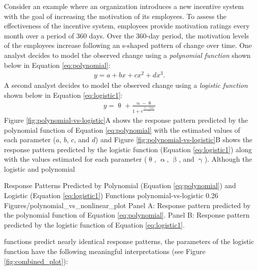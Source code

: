 \documentclass[
12pt, %
twoside,
english]{guelphthesis}
\begin{document}
Consider an example where an organization introduces a new incentive system with the goal of increasing the motivation of its employees. To assess the effectiveness of the incentive system, employees provide motivation ratings every month over a period of 360 days. Over the 360-day period, the motivation levels of the employees increase following an s-shaped pattern of change over time. One analyst decides to model the observed change using a \emph{polynomial function} shown below in Equation \ref{eq:polynomial}:
\begin{align}
  y = \mathit{a} + \mathit{b}x + \mathit{c}x^2 + \mathit{d}x^3.
  \label{eq:polynomial}
\end{align}
\noindent A second analyst decides to model the observed change using a \emph{logistic function} shown below in Equation \ref{eq:logistic1}:
\begin{align}
  y = \uptheta + \frac{\upalpha - \uptheta}{1 + e^{\frac{\upbeta -time}{\upgamma}}}
  \label{eq:logistic1}
\end{align}
\noindent  Figure \ref{fig:polynomial-vs-logistic}A shows the response pattern predicted by the polynomial function of Equation \ref{eq:polynomial} with the estimated values of each parameter (\(a\), \(b\), \(c\), and \(d\)) and Figure \ref{fig:polynomial-vs-logistic}B shows the response pattern predicted by the logistic function (Equation \ref{eq:logistic1}) along with the values estimated for each parameter (\(\uptheta\), \(\upalpha\), \(\upbeta\), and \(\upgamma\)). Although the logistic and polynomial
\begin{apaFigure}
[portrait]
[samepage]
[0cm]
{Response Patterns Predicted by Polynomial (Equation \ref{eq:polynomial}) and Logistic (Equation \ref{eq:logistic1}) Functions}
{polynomial-vs-logistic}
{0.26}
{Figures/polynomial_vs_nonlinear_plot}
{Panel A: Response pattern predicted by the polynomial function of Equation \eqref{eq:polynomial}. Panel B: Response pattern predicted by the logistic function of Equation \eqref{eq:logistic1}.}
\end{apaFigure}
\noindent functions predict nearly identical response patterns, the parameters of the logistic function have the following meaningful interpretations (see Figure \ref{fig:combined_plot}):
\end{document}
